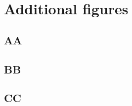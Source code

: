 \chapter{Additional figures}

\section{AA}
\lipsum[2]

\section{BB}
\lipsum[2]

\section{CC}
\lipsum[2]

